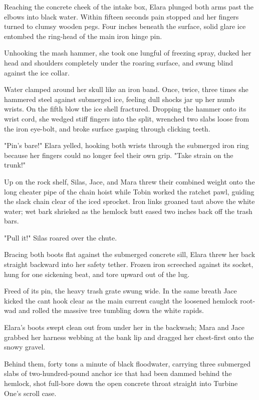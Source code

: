 Reaching the concrete cheek of the intake box, Elara plunged both arms past the elbows into black water. Within fifteen seconds pain stopped and her fingers turned to clumsy wooden pegs. Four inches beneath the surface, solid glare ice entombed the ring-head of the main iron hinge pin.

Unhooking the mash hammer, she took one lungful of freezing spray, ducked her head and shoulders completely under the roaring surface, and swung blind against the ice collar.

Water clamped around her skull like an iron band. Once, twice, three times she hammered steel against submerged ice, feeling dull shocks jar up her numb wrists. On the fifth blow the ice shell fractured. Dropping the hammer onto its wrist cord, she wedged stiff fingers into the split, wrenched two slabs loose from the iron eye-bolt, and broke surface gasping through clicking teeth.

"Pin's bare!" Elara yelled, hooking both wrists through the submerged iron ring because her fingers could no longer feel their own grip. "Take strain on the trunk!"

Up on the rock shelf, Silas, Jace, and Mara threw their combined weight onto the long cheater pipe of the chain hoist while Tobin worked the ratchet pawl, guiding the slack chain clear of the iced sprocket. Iron links groaned taut above the white water; wet bark shrieked as the hemlock butt eased two inches back off the trash bars.

"Pull it!" Silas roared over the chute.

Bracing both boots flat against the submerged concrete sill, Elara threw her back straight backward into her safety tether. Frozen iron screeched against its socket, hung for one sickening beat, and tore upward out of the lug.

Freed of its pin, the heavy trash grate swung wide. In the same breath Jace kicked the cant hook clear as the main current caught the loosened hemlock root-wad and rolled the massive tree tumbling down the white rapids.

Elara's boots swept clean out from under her in the backwash; Mara and Jace grabbed her harness webbing at the bank lip and dragged her chest-first onto the snowy gravel.

Behind them, forty tons a minute of black floodwater, carrying three submerged slabs of two-hundred-pound anchor ice that had been dammed behind the hemlock, shot full-bore down the open concrete throat straight into Turbine One's scroll case.

